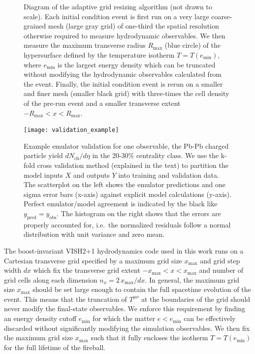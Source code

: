 \documentclass[aps,prc,reprint,amsmath,nofootinbib]{revtex4-1}
\newcommand{\nch}{N_\text{ch}}
\begin{document}
\begin{figure}
  \caption{Diagram of the adaptive grid resizing algorithm (not drawn to scale). Each initial condition event is first run on a very large coarse-grained mesh (large gray grid) of one-third the spatial resolution otherwise required to measure hydrodynamic observables. We then measure the maximum transverse radius $R_\text{max}$ (blue circle) of the hypersurface defined by the temperature isotherm $T = T(e_\text{min})$, where $e_\text{min}$ is the largest energy density which can be truncated without modifying the hydrodynamic observables calculated from the event. Finally, the initial condition event is rerun on a smaller and finer mesh (smaller black grid) with three-times the cell density of the pre-run event and a smaller transverse extent $-R_\text{max} < x < R_\text{max}$.}
  \label{fig:adaptive_grid}
\end{figure}

\begin{figure}
  \texttt{[image: validation\_example]}
  \caption{Example emulator validation for one observable, the Pb-Pb charged particle yield $d\nch/d\eta$ in the 20-30\% centrality class. We use the k-fold cross validation method (explained in the text) to partition the model inputs $X$ and outputs $Y$ into training and validation data. The scatterplot on the left shows the emulator predictions and one sigma error bars (x-axis) against explicit model calculations (y-axis). Perfect emulator/model agreement is indicated by the black like $y_\text{pred}=y_\text{obs}$. The histogram on the right shows that the errors are properly accounted for, i.e.\ the normalized residuals follow a normal distribution with unit variance and zero mean.
  }
  \label{fig:validation_example}
\end{figure}

The boost-invariant \textsc{VISH2+1} hydrodynamics code used in this work \cite{Song:2007ux, Shen:2014vra} runs on a Cartesian transverse grid specified by a maximum grid size $x_\text{max}$ and grid step width $dx$ which fix the transverse grid extent ${-x_\text{max} < x < x_\text{max}}$ and number of grid cells along each dimension ${n_x = 2\, x_\text{max} / dx}$.
In general, the maximum grid size $x_\text{max}$ should be set large enough to contain the full spacetime evolution of the event.
This means that the truncation of $T^{\mu\nu}$ at the boundaries of the grid should never modify the final-state observables.
We enforce this requirement by finding an energy density cutoff $e_\text{min}$ for which the matter $e < e_\text{min}$ can be effectively discarded without significantly modifying the simulation observables.
We then fix the maximum grid size $x_\text{max}$ such that it fully encloses the isotherm $T=T(e_\text{min})$ for the full lifetime of the fireball.
\end{document}
